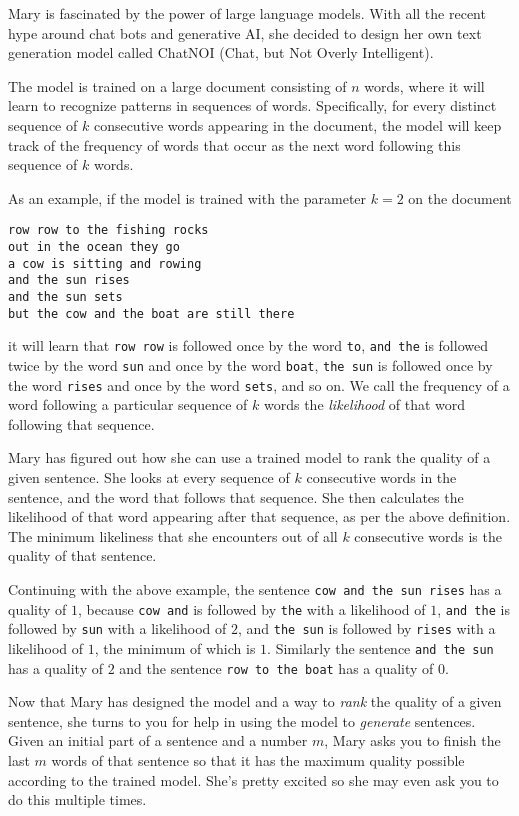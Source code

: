 Mary is fascinated by the power of large language models. With all the recent
hype around chat bots and generative AI, she decided to design her own text
generation model called ChatNOI (Chat, but Not Overly Intelligent).

The model is trained on a large document consisting of $n$ words, where it will
learn to recognize patterns in sequences of words. Specifically, for every
distinct sequence of $k$ consecutive words appearing in the document, the model
will keep track of the frequency of words that occur as the next word following
this sequence of $k$ words.

As an example, if the model is trained with the parameter $k = 2$ on the document
\begin{verbatim}
row row to the fishing rocks
out in the ocean they go
a cow is sitting and rowing
and the sun rises
and the sun sets
but the cow and the boat are still there
\end{verbatim}
it will learn that \texttt{row row} is followed once by the word \texttt{to},
\texttt{and the} is followed twice by the word \texttt{sun} and once by the
word \texttt{boat}, \texttt{the sun} is followed once by the word
\texttt{rises} and once by the word \texttt{sets}, and so on. We call the
frequency of a word following a particular sequence of $k$ words the
\textit{likelihood} of that word following that sequence.

Mary has figured out how she can use a trained model to rank the quality of a
given sentence. She looks at every sequence of $k$ consecutive words in the
sentence, and the word that follows that sequence. She then calculates the
likelihood of that word appearing after that sequence, as per the above
definition. The minimum likeliness that she encounters out of all $k$
consecutive words is the quality of that sentence.

Continuing with the above example, the sentence \texttt{cow and the sun rises}
has a quality of $1$, because \texttt{cow and} is followed by \texttt{the} with
a likelihood of $1$, \texttt{and the} is followed by \texttt{sun} with a
likelihood of $2$, and \texttt{the sun} is followed by \texttt{rises} with a
likelihood of $1$, the minimum of which is $1$. Similarly the sentence
\texttt{and the sun} has a quality of $2$ and the sentence \texttt{row to the
boat} has a quality of $0$.

Now that Mary has designed the model and a way to \textit{rank} the quality of
a given sentence, she turns to you for help in using the model to
\textit{generate} sentences. Given an initial part of a sentence and a number
$m$, Mary asks you to finish the last $m$ words of that sentence so that it has
the maximum quality possible according to the trained model. She's pretty
excited so she may even ask you to do this multiple times.

